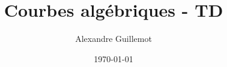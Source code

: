 \documentclass[11pt]{report}
\begin{document}
\title{Courbes algébriques - TD}
\date{\today}
\author{Alexandre Guillemot}
\maketitle

\tableofcontents

\pagestyle{fancy}
\fancyhf{}
\lhead{\leftmark}
\cfoot{\thepage}


\end{document}
